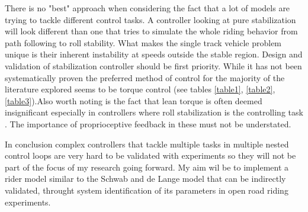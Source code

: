 There is no "best" approach when considering the fact that a lot of models are trying to tackle different control tasks. A controller looking at pure stabilization will look different than one that tries to simulate the whole riding behavior from path following to roll stability. What makes the single track vehicle problem unique is their inherent instability at speeds outside the stable region. Design and validation of stabilization controller should be first priority.  While it has not been systematically proven the preferred method of control for the majority of the literature explored seems to be torque control (see tables \ref{table1}, \ref{table2}, \ref{table3}).Also worth noting is the fact that lean torque is often deemed insignificant especially in controllers where roll stabilization is the controlling task \cite{katayama1988control,van1970influence,hess2012modeling,schwab2013}. The importance of proprioceptive feedback in these must not be understated.

In conclusion complex controllers that tackle multiple tasks in multiple nested control loops are very hard to be validated with experiments so they will not be part of the focus of my research going forward. My aim wil be to implement a rider model similar to the Schwab and de Lange model \cite{schwab2013} that can be indirectly validated, throught system identification of its parameters in open road riding experiments.

